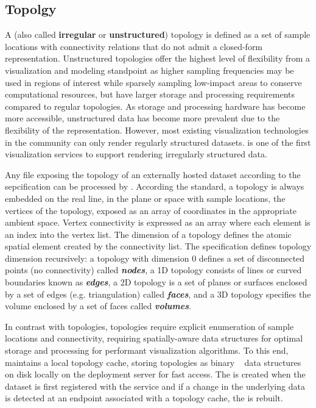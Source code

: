 \subsection{\ugrid{} Topolgy}
\label{sec:ugrid}
A \ugrid{} (also called {\bf irregular} or {\bf unstructured})
topology is defined as a set of sample locations with connectivity
relations that do not admit a closed-form representation. Unstructured
topologies offer the highest level of flexibility from a visualization
and modeling standpoint as higher sampling frequencies may be used in
regions of interest while sparsely sampling low-impact areas to
conserve computational resources, but have larger storage and
processing requirements compared to regular topologies. As storage and
processing hardware has become more accessible, unstructured data has
become more prevalent due to the flexibility of the
representation. However, most existing visualization technologies in
the \cf{} community can only render regularly structured
datasets. \sciwms{} is one of the first visualization services to
support rendering irregularly structured data.

Any \ncml{} file exposing the topology of an externally hosted dataset
according to the \cfugrid{} sepcification can be processed by
\sciwms{}. According the \cfugrid{} standard, a topology is always
embedded on the real line, in the plane or space with sample
locations, the vertices of the topology, exposed as an array of
coordinates in the appropriate ambient space. Vertex connectivity is
expressed as an array where each element is an index into the vertex
list. The dimension of a topology defines the atomic spatial element
created by the connectivity list. The \cfugrid{} specification defines
topology dimension recursively: a topology with dimension 0 defines a
set of disconnected points (no connectivity) called
\textbf{\textit{nodes}}, a 1D topology consists of lines or curved
boundaries known as \textbf{\textit{edges}}, a 2D topology is a set of
planes or surfaces enclosed by a set of edges (e.g. triangulation)
called \textbf{\textit{faces}}, and a 3D topology specifies the volume
enclosed by a set of faces called \textbf{\textit{volumes}}.

In contrast with \cgrid{} topologies, \ugrid{} topologies require
explicit enumeration of sample locations and connectivity, requiring
spatially-aware data structures for optimal storage and processing for
performant visualization algorithms. To this end, \sciwms{} maintains
a local topology cache, storing \ugrid{} topologies as binary
\rtree{}~\cite{Guttman84} data structures on disk locally on the
deployment server for fast access. The \rtree{} is created when the
dataset is first registered with the \sciwms{} service and if a change
in the underlying data is detected at an endpoint associated with a
topology cache, the \rtree{} is rebuilt.
